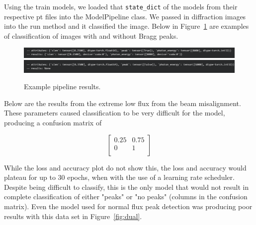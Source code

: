 \documentclass[12pt]{article}
\begin{document}
Using the train models, we loaded that \texttt{state\_dict} of the models from their respective pt files into the ModelPipeline class. We passed in diffraction images into the run method and it classified the image. Below in Figure~\ref{fig:pipeline_true} are examples of classification of images with and without Bragg peaks.\\

\begin{figure}[H]
    \centering
    \includegraphics[width=1\textwidth]{pipeline_true.png}
    \includegraphics[width=1\textwidth]{pipeline_false.png}
    \caption{Example pipeline results.}
    \label{fig:pipeline_true}
\end{figure}

Below are the results from the extreme low flux from the beam misalignment. These parameters caused classification to be very difficult for the model, producing a confusion matrix of 

\[
\begin{bmatrix}
    0.25 & 0.75\\
    0 & 1\\
\end{bmatrix}
\]

While the loss and accuracy plot do not show this, the loss and accuracy would plateau for up to 30 epochs, when with the use of a learning rate scheduler. Despite being difficult to classify, this is the only model that would not result in complete classification of either "peaks" or "no peaks" (columns in the confusion matrix). Even the model used for normal flux peak detection was producing poor results with this data set in Figure~\ref{fig:dual}.\\
\end{document}
